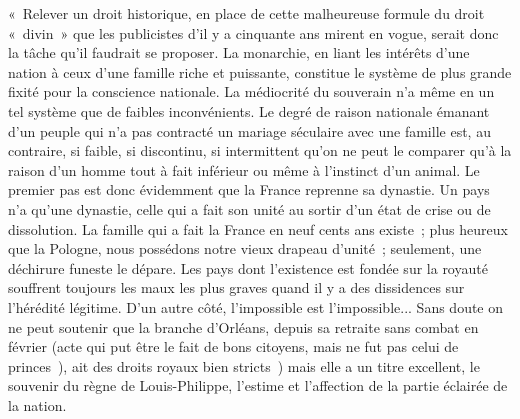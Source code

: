 \documentclass[french,twoside]{book} %
\newenvironment{quoteblock}%
  {\begin{quoting}}
  {\end{quoting}}
\newenvironment{quotebar}{%
    \def\FrameCommand{{\color{rubric!10!}\vrule width 0.5em} \hspace{0.9em}}%
    \def\OuterFrameSep{\itemsep} %
    \MakeFramed {\advance\hsize-\width \FrameRestore}
  }%
  {%
    \endMakeFramed
  }
\renewenvironment{quoteblock}%
  {%
    \savenotes
    \setstretch{0.9}
    \normalfont
    \begin{quotebar}
  }
  {%
    \end{quotebar}
    \spewnotes
  }
\begin{document}
\begin{quoteblock}
 « Relever un droit historique, en place de cette malheureuse formule du droit « divin » que les publicistes d’il y a cinquante ans mirent en vogue, serait donc la tâche qu’il faudrait se proposer. La monarchie, en liant les intérêts d’une nation à ceux d’une famille riche et puissante, constitue le système de plus grande fixité pour la conscience nationale. La médiocrité du souverain n’a même en un tel système que de faibles inconvénients. Le degré de raison nationale émanant d’un peuple qui n’a pas contracté un mariage séculaire avec une famille est, au contraire, si faible, si discontinu, si intermittent qu’on ne peut le comparer qu’à la raison d’un homme tout à fait inférieur ou même à l’instinct d’un animal. Le premier pas est donc évidemment que la France reprenne sa dynastie. Un pays n’a qu’une dynastie, celle qui a fait son unité au sortir d’un état de crise ou de dissolution. La famille qui a fait la France en neuf cents ans existe ; plus heureux que la Pologne, nous possédons notre vieux drapeau d’unité ; seulement, une déchirure funeste le dépare. Les pays dont l’existence est fondée sur la royauté souffrent toujours les maux les plus graves quand il y a des dissidences sur l’hérédité légitime. D’un autre côté, l’impossible est l’impossible... Sans doute on ne peut soutenir que la branche d’Orléans, depuis sa retraite sans combat en février (acte qui put être le fait de bons citoyens, mais ne fut pas celui de princes ), ait des droits royaux bien stricts ) mais elle a un titre excellent, le souvenir du règne de Louis-Philippe, l’estime et l’affection de la partie éclairée de la nation.\par

\end{quoteblock}
\end{document}
